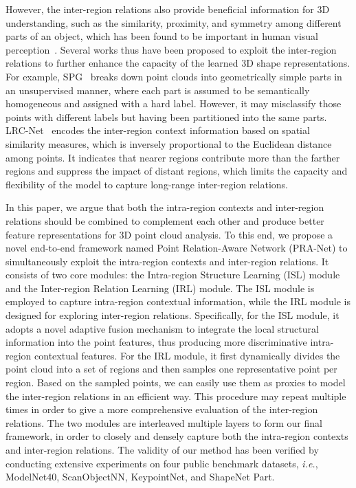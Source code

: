\documentclass[journal]{IEEEtran}
\def\ie{\emph{i.e.}}
\begin{document}
However, the inter-region relations also provide beneficial information for 3D understanding, such as the similarity, proximity, and symmetry among different parts of an object, which has been found to be important in human visual perception~\cite{wertheimer1923laws}. Several works thus have been proposed to exploit the inter-region relations to further enhance the capacity of the learned 3D shape representations. For example, SPG~\cite{landrieu2018large} breaks down point clouds into geometrically simple parts in an unsupervised manner, where each part is assumed to be semantically homogeneous and assigned with a hard label.
However, it may misclassify those points with different labels but having been partitioned into the same parts. 
LRC-Net~\cite{liu2020lrc} encodes the inter-region context information based on spatial similarity measures, which is inversely proportional to the Euclidean distance among points. It indicates that nearer regions contribute more than the farther regions and suppress the impact of distant regions, which limits the capacity and flexibility of the model to capture long-range inter-region relations.




In this paper, we argue that both the intra-region contexts and inter-region relations should be combined to complement each other and produce better feature representations for 3D point cloud analysis. To this end, we propose a novel end-to-end framework named Point Relation-Aware Network (PRA-Net) to simultaneously exploit the intra-region contexts and inter-region relations. It consists of two core modules: the Intra-region Structure Learning (ISL) module and the Inter-region Relation Learning (IRL) module. The ISL module is employed to capture intra-region contextual information, while the IRL module is designed for exploring inter-region relations. Specifically, for the ISL module, it adopts a novel adaptive fusion mechanism to integrate the local structural information into the point features, thus producing more discriminative intra-region contextual features. For the IRL module, it first dynamically divides the point cloud into a set of regions and then samples one representative point per region. Based on the sampled points, we can easily use them as proxies to model the inter-region relations in an efficient way.
This procedure may repeat multiple times in order to give a more comprehensive evaluation of the inter-region relations. The two modules are interleaved multiple layers to form our final framework, in order to closely and densely capture both the intra-region contexts and inter-region relations. 
The validity of our method has been verified by conducting extensive experiments on four public benchmark datasets, \ie, ModelNet40, ScanObjectNN, KeypointNet, and ShapeNet Part.
\end{document}

